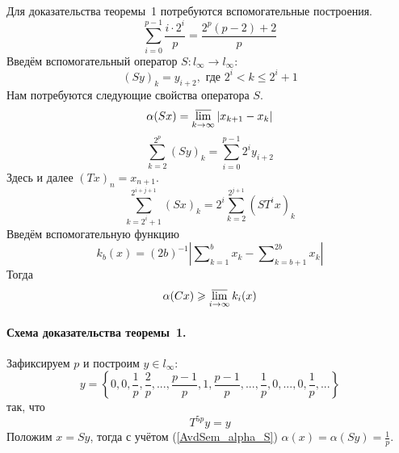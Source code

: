 Для доказательства теоремы~1 потребуются вспомогательные
построения.
\begin{equation}\label{AvdSem_summa_drobey}
    \sum_{i=0}^{p-1} \frac{i \cdot 2^i}{p} = \frac{2^p(p-2) + 2}{p}
\end{equation}
Введём вспомогательный оператор $S:l_\infty \to l_\infty$:
\begin{equation*}\label{operator_S}
    (Sy)_k = y_{i+2}, \mbox{ где } 2^i < k \leqslant 2^i+1
\end{equation*}
Нам потребуются следующие свойства оператора $S$.
\begin{equation}\label{AvdSem_alpha_S}
    \alpha(Sx) = \varlimsup_{k\to\infty} |x_{k+1} - x_{k}|
\end{equation}
\begin{equation}\label{AvdSem_summa_S_less}
    \sum_{k=2}^{2^p} (Sy)_k =
    \sum_{i=0}^{p-1} 2^i y_{i+2}
\end{equation}
Здесь и далее $(Tx)_n = x_{n+1}$.
\begin{equation}\label{AvdSem_summa_S}
    \sum_{k=2^i+1}^{2^{i+j+1}} (Sx)_k =
    2^i\sum_{k=2}^{2^{j+1}} (ST^ix)_k
\end{equation}
Введём вспомогательную функцию
\begin{equation*}\label{def_k_b}
    k_b(x) = (2b)^{-1} \left|
        \sum\nolimits_{k=1}^{b}x_k - \sum\nolimits_{k=b+1}^{2b}x_k
    \right|
\end{equation*}
Тогда
\begin{equation}\label{AvdSem_alpha_greater_k_b}
    \alpha (Cx) \geqslant \varlimsup_{i\to \infty} k_i(x)
\end{equation}

\paragraph{Схема доказательства теоремы~1.}
Зафиксируем $p$ и построим $y\in l_\infty$:
\begin{equation*}\label{y_construction}
    y = \left\{
        0, 0, \frac{1}{p}, \frac{2}{p}, %
        ...,
        \frac{p-1}{p}, 1, \frac{p-1}{p},
        ...,
        \frac{1}{p},
        0, ..., 0,
        \frac{1}{p}, ...
    \right\}
\end{equation*}
так, что
\begin{equation}\label{AvdSem_T_y}
    T^{5p}y = y
\end{equation}
Положим $x = Sy$, тогда с учётом (\ref{AvdSem_alpha_S}) $
    \alpha (x) = \alpha (Sy) = \frac{1}{p}
$.

